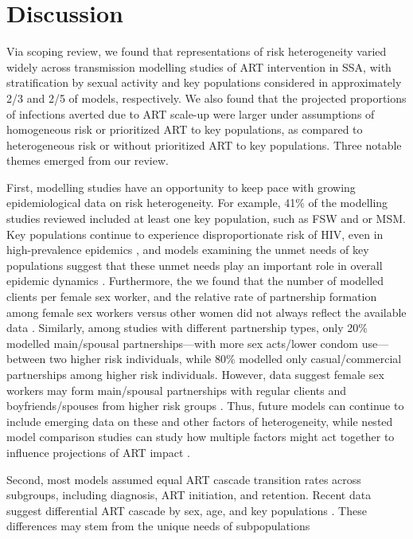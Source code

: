 \section{Discussion}
\label{s:disc}
Via scoping review, we found that representations of risk heterogeneity varied widely across
transmission modelling studies of ART intervention in SSA, with
stratification by sexual activity and key populations considered in approximately
2/3 and 2/5 of models, respectively.
We also found that the projected proportions of infections averted due to ART scale-up were
larger under assumptions of homogeneous risk or prioritized ART to key populations,
as compared to heterogeneous risk or without prioritized ART to key populations.
Three notable themes emerged from our review.
\par
First, modelling studies have an opportunity to keep pace with growing epidemiological data on risk heterogeneity.
For example, 41\% of the modelling studies reviewed included at least one key population, such as FSW and or MSM.
Key populations continue to experience disproportionate risk of HIV, even in high-prevalence epidemics \cite{AIDSinfo},
and models examining the unmet needs of key populations suggest that
these unmet needs play an important role in overall epidemic dynamics \cite{Stone2021,Bekker2015}.
Furthermore, the we found that the number of modelled clients per female sex worker, and
the relative rate of partnership formation among female sex workers versus other women
did not always reflect the available data \cite{Watts2010,Scorgie2012}.
Similarly, among studies with different partnership types, only 20\% modelled
main/spousal partnerships---with more sex acts/lower condom use---between two higher risk individuals,
while 80\% modelled only casual/commercial partnerships among higher risk individuals.
However, data suggest female sex workers may form main/spousal partnerships
with regular clients and boyfriends/spouses from higher risk groups \cite{Scorgie2012}.
Thus, future models can continue to include emerging data on these and other factors of heterogeneity,
while nested model comparison studies can study how
multiple factors might act together to influence projections of ART impact \cite{Dodd2010,Hontelez2013}.
\par
Second, most models assumed equal ART cascade transition rates across subgroups,
including diagnosis, ART initiation, and retention.
Recent data suggest differential ART cascade by sex, age, and key populations
\cite{Lancaster2016,Schwartz2017,Ma2020,Green2020}.
These differences may stem from the unique needs of subpopulations
